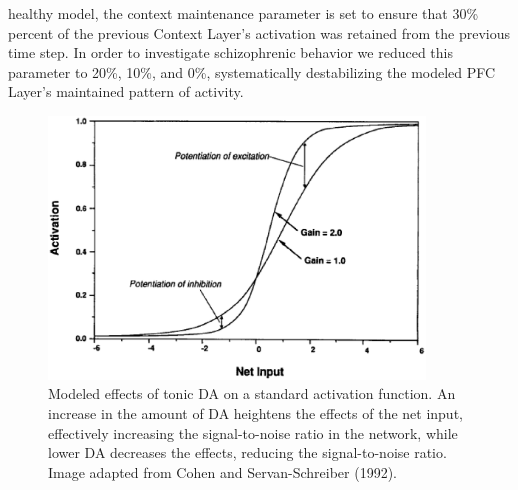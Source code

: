 \documentclass[man]{apa}
\begin{document}
healthy model, the context maintenance parameter is set to ensure that 30\% percent of the previous Context Layer's activation was retained from the previous time step.  In order to investigate schizophrenic behavior we reduced this parameter to 20\%, 10\%, and 0\%, systematically destabilizing the modeled PFC Layer's maintained pattern of activity. 

\begin{figure}[tp]
\begin{center}
	\includegraphics[width=100mm]{figures/gain_manipulation.eps}
\end{center}
\caption{Modeled effects of tonic DA on a standard activation function. An increase in the amount of DA heightens the effects of the net input, effectively increasing the signal-to-noise ratio in the network, while lower DA decreases the effects, reducing the signal-to-noise ratio. Image adapted from Cohen and Servan-Schreiber (1992).}
\label{gain-manipulation}
\end{figure} 
\end{document}
